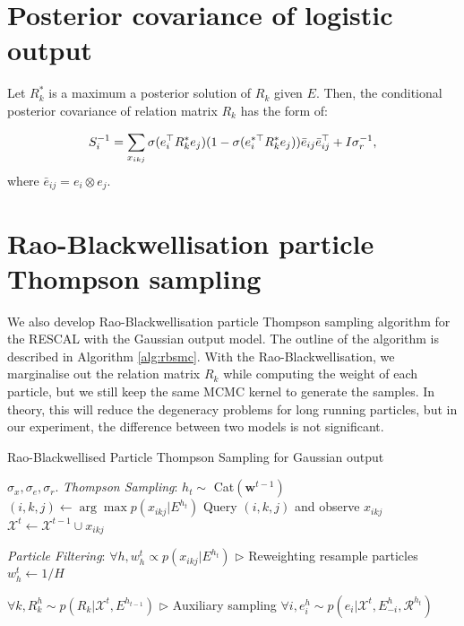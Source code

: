 \section{Posterior covariance of logistic output}
Let $R_k^*$ is a maximum a posterior solution of $R_k$ given $E$. Then, the conditional posterior covariance of relation matrix $R_k$ has the form of:

\begin{align}
S_i^{-1} = \sum_{x_{ikj}} \sigma(e_{i}^{\top} R_k^* e_{j}) (1 - \sigma(e_{i}^{*\top} R_k^* e_{j})) 
\bar{e}_{ij}\bar{e}_{ij}^\top + I\sigma_r^{-1}, \notag
\end{align}
where $\bar{e}_{ij} = e_i \otimes e_j$.

\section{Rao-Blackwellisation particle Thompson sampling}
We also develop Rao-Blackwellisation particle Thompson sampling algorithm for the RESCAL with the Gaussian output model. The outline of the algorithm is described in Algorithm \ref{alg:rbsmc}. With the Rao-Blackwellisation, we marginalise out the relation matrix $R_k$ while computing the weight of each particle, but we still keep the same MCMC kernel to generate the samples. In theory, this will reduce the degeneracy problems for long running particles, but in our experiment, the difference between two models is not significant.
\begin{algorithm}[t!]
   \caption{Rao-Blackwellised Particle Thompson Sampling for Gaussian output}
   \label{alg:rbsmc}
\begin{algorithmic}
    $\sigma_x, \sigma_e, \sigma_r$.
   \STATE \textit{Thompson Sampling}:
   \STATE $h_t \sim $ Cat$(\mathbf{w}^{t-1})$
   \STATE $(i,k,j) \leftarrow \arg\max p(x_{ikj}| E^{h_t})$   %
   \STATE Query $(i,k,j)$ and observe $x_{ikj}$
   \STATE $\mathcal{X}^{t} \leftarrow \mathcal{X}^{t-1} \cup x_{ikj}$

   \STATE \textit{Particle Filtering}:
   \STATE $\forall h, w_h^{t} \propto p(x_{ikj} | E^{h_t})$   \hfill $\triangleright$ Reweighting%
   \STATE resample particles
   \STATE $w_h^{t} \leftarrow 1/H$
   \ENDIF

   \STATE $\forall k, R_k^{h} \sim p(R_k | \mathcal{X}^{t}, E^{h_{t-1}})$   \hfill $\triangleright$ Auxiliary sampling%
   \STATE $\forall i, e^{h}_i \sim p(e_i | \mathcal{X}^{t}, E^{h}_{-i}, \mathcal{R}^{h_t})$ %
   \ENDFOR

   \ENDFOR
\end{algorithmic}
\end{algorithm}
